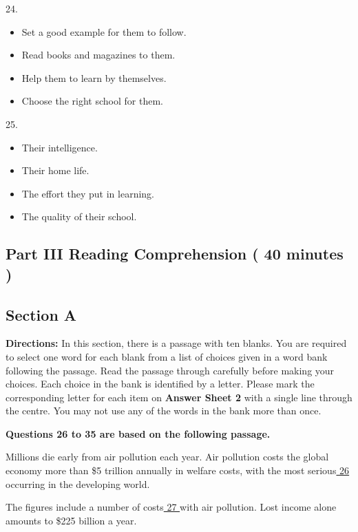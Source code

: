 \documentclass[UTF8,11pt]{ctexart}
\begin{document}
24.


\begin{itemize}[leftmargin=2em,itemsep=.2em,topsep=.4em]\item[A.] Set a good example for them to follow.
\item[B.] Read books and magazines to them.
\item[C.] Help them to learn by themselves.
\item[D.] Choose the right school for them.
\end{itemize}

25.


\begin{itemize}[leftmargin=2em,itemsep=.2em,topsep=.4em]\item[A.] Their intelligence.
\item[B.] Their home life.
\item[C.] The effort they put in learning.
\item[D.] The quality of their school.
\end{itemize}

\subsection*{\textbf{Part} III \textbf{Reading Comprehension} \textbf{( 40 minutes )}}


\subsection*{\textbf{Section A}}


\textbf{Directions:} In this section, there is a passage with ten blanks. You are required to select one word for each blank from a list of choices given in a word bank following the passage. Read the passage through carefully before making your choices. Each choice in the bank is identified by a letter. Please mark the corresponding letter for each item on\textbf{ Answer Sheet 2} with a single line through the centre. You may not use any of the words in the bank more than once.


\textbf{Questions 26 to 35 are based on the following passage.}


Millions die early from air pollution each year. Air pollution costs the global economy more than \$5 trillion annually in welfare costs, with the most serious\uline{ 26 }occurring in the developing world.


The figures include a number of costs\uline{ 27 }with air pollution. Lost income alone amounts to \$225 billion a year.
\end{document}
